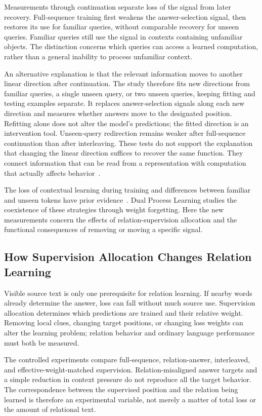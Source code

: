 Measurements through continuation separate loss of the signal from later recovery. Full-sequence training first weakens the answer-selection signal, then restores its use for familiar queries, without comparable recovery for unseen queries. Familiar queries still use the signal in contexts containing unfamiliar objects. The distinction concerns which queries can access a learned computation, rather than a general inability to process unfamiliar context.

An alternative explanation is that the relevant information moves to another linear direction after continuation. The study therefore fits new directions from familiar queries, a single unseen query, or two unseen queries, keeping fitting and testing examples separate. It replaces answer-selection signals along each new direction and measures whether answers move to the designated position. Refitting alone does not alter the model's predictions; the fitted direction is an intervention tool. Unseen-query redirection remains weaker after full-sequence continuation than after interleaving. These tests do not support the explanation that changing the linear direction suffices to recover the same function. They connect information that can be read from a representation with computation that actually affects behavior~\citep{geiger2021causal,zhang2024patching}.

The loss of contextual learning during training and differences between familiar and unseen tokens have prior evidence~\citep{singh2023transient,anand2025dual}. Dual Process Learning studies the coexistence of these strategies through weight forgetting. Here the new measurements concern the effects of relation-supervision allocation and the functional consequences of removing or moving a specific signal.

\subsection{How Supervision Allocation Changes Relation Learning}

Visible source text is only one prerequisite for relation learning. If nearby words already determine the answer, loss can fall without much source use. Supervision allocation determines which predictions are trained and their relative weight. Removing local clues, changing target positions, or changing loss weights can alter the learning problem; relation behavior and ordinary language performance must both be measured.

The controlled experiments compare full-sequence, relation-answer, interleaved, and effective-weight-matched supervision. Relation-misaligned answer targets and a simple reduction in context pressure do not reproduce all the target behavior. The correspondence between the supervised position and the relation being learned is therefore an experimental variable, not merely a matter of total loss or the amount of relational text.

